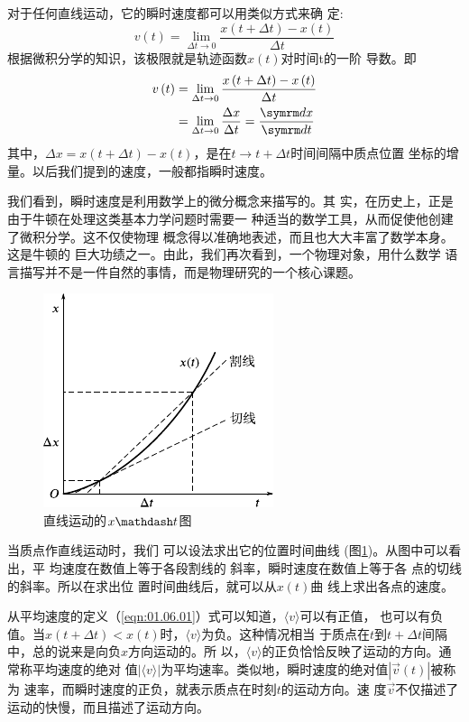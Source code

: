 对于任何直线运动，它的瞬时速度都可以用类似方式来确
定:
\begin{equation*}
  v\left(t\right)=\lim _{\Delta t \rightarrow 0} \frac{x\left(t+\Delta t\right)-x\left(t\right)}{\Delta t}
\end{equation*}
根据微积分学的知识，该极限就是轨迹函数$x\left(t\right)$对时间t的一阶
导数。即
\begin{equation}
  \begin{aligned}
    v\left(t\right) & =\lim _{\Delta t \rightarrow 0} \frac{x\left(t+\Delta t\right)-x\left(t\right)}{\Delta t}            \\
                    & =\lim _{\Delta t \rightarrow 0} \frac{\Delta x}{\Delta t}=\frac{\dif x}{\dif t} \label{eqn:01.06.03}
  \end{aligned}
\end{equation}
其中，$\Delta x=x\left(t+\Delta t\right)-x\left(t\right)$，是在$t\rightarrow t+\Delta t$时间间隔中质点位置
坐标的增量。以后我们提到的速度，一般都指瞬时速度。

我们看到，瞬时速度是利用数学上的微分概念来描写的。其
实，在历史上，正是由于牛顿在处理这类基本力学问题时需要一
种适当的数学工具，从而促使他创建了微积分学。这不仅使物理
概念得以准确地表述，而且也大大丰富了数学本身。这是牛顿的
巨大功绩之一。由此，我们再次看到，一个物理对象，用什么数学
语言描写并不是一件自然的事情，而是物理研究的一个核心课题。

\begin{figure}
  \centering
  \includegraphics{figure/fig01.10}
  \caption{直线运动的$x \mathdash t$图}
  \label{fig:01.10}
\end{figure}
当质点作直线运动时，我们
可以设法求出它的位置时间曲线
(图\ref{fig:01.10})。从图中可以看出，平
均速度在数值上等于各段割线的
斜率，瞬时速度在数值上等于各
点的切线的斜率。所以在求出位
置时间曲线后，就可以从$x\left(t\right)$曲
线上求出各点的速度。

从平均速度的定义（\ref{eqn:01.06.01}）式可以知道，$\langle v\rangle$可以有正值，
也可以有负值。当$x\left(t+\Delta t\right)<x\left(t\right)$时，$\langle v\rangle$为负。这种情况相当
于质点在$t$到$t+\Delta t$间隔中，总的说来是向负$x$方向运动的。所
以，$\langle v\rangle$的正负恰恰反映了运动的方向。通常称平均速度的绝对
值$|\langle v\rangle|$为平均速率。类似地，瞬时速度的绝对值$|\vec{v}\left(t\right)|$被称为
速率，而瞬时速度的正负，就表示质点在时刻$t$的运动方向。速
度$\vec{v}$不仅描述了运动的快慢，而且描述了运动方向。